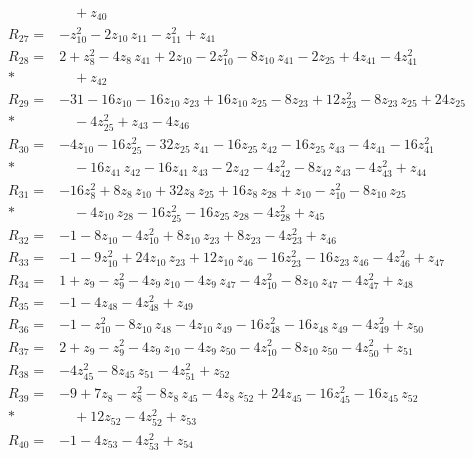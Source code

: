 \documentclass[11pt]{article}
\theoremstyle{remark}\newtheorem{remark}[theorem]{Remark}
\begin{document}
\begin{align*}
&\quad  + z_{40} \\[2pt]
R_{27}={}& -z_{10}^{2} - 2z_{10}\,z_{11} - z_{11}^{2} + z_{41} \\[2pt]
R_{28}={}& 2 + z_{8}^{2} - 4z_{8}\,z_{41} + 2z_{10} - 2z_{10}^{2} - 8z_{10}\,z_{41} - 2z_{25} + 4z_{41} - 4z_{41}^{2} \\*
&\quad  + z_{42} \\[2pt]
R_{29}={}& -31 - 16z_{10} - 16z_{10}\,z_{23} + 16z_{10}\,z_{25} - 8z_{23} + 12z_{23}^{2} - 8z_{23}\,z_{25} + 24z_{25} \\*
&\quad  - 4z_{25}^{2} + z_{43} - 4z_{46} \\[2pt]
R_{30}={}& -4z_{10} - 16z_{25}^{2} - 32z_{25}\,z_{41} - 16z_{25}\,z_{42} - 16z_{25}\,z_{43} - 4z_{41} - 16z_{41}^{2} \\*
&\quad  - 16z_{41}\,z_{42} - 16z_{41}\,z_{43} - 2z_{42} - 4z_{42}^{2} - 8z_{42}\,z_{43} - 4z_{43}^{2} + z_{44} \\[2pt]
R_{31}={}& -16z_{8}^{2} + 8z_{8}\,z_{10} + 32z_{8}\,z_{25} + 16z_{8}\,z_{28} + z_{10} - z_{10}^{2} - 8z_{10}\,z_{25} \\*
&\quad  - 4z_{10}\,z_{28} - 16z_{25}^{2} - 16z_{25}\,z_{28} - 4z_{28}^{2} + z_{45} \\[2pt]
R_{32}={}& -1 - 8z_{10} - 4z_{10}^{2} + 8z_{10}\,z_{23} + 8z_{23} - 4z_{23}^{2} + z_{46} \\[2pt]
R_{33}={}& -1 - 9z_{10}^{2} + 24z_{10}\,z_{23} + 12z_{10}\,z_{46} - 16z_{23}^{2} - 16z_{23}\,z_{46} - 4z_{46}^{2} + z_{47} \\[2pt]
R_{34}={}& 1 + z_{9} - z_{9}^{2} - 4z_{9}\,z_{10} - 4z_{9}\,z_{47} - 4z_{10}^{2} - 8z_{10}\,z_{47} - 4z_{47}^{2} + z_{48} \\[2pt]
R_{35}={}& -1 - 4z_{48} - 4z_{48}^{2} + z_{49} \\[2pt]
R_{36}={}& -1 - z_{10}^{2} - 8z_{10}\,z_{48} - 4z_{10}\,z_{49} - 16z_{48}^{2} - 16z_{48}\,z_{49} - 4z_{49}^{2} + z_{50} \\[2pt]
R_{37}={}& 2 + z_{9} - z_{9}^{2} - 4z_{9}\,z_{10} - 4z_{9}\,z_{50} - 4z_{10}^{2} - 8z_{10}\,z_{50} - 4z_{50}^{2} + z_{51} \\[2pt]
R_{38}={}& -4z_{45}^{2} - 8z_{45}\,z_{51} - 4z_{51}^{2} + z_{52} \\[2pt]
R_{39}={}& -9 + 7z_{8} - z_{8}^{2} - 8z_{8}\,z_{45} - 4z_{8}\,z_{52} + 24z_{45} - 16z_{45}^{2} - 16z_{45}\,z_{52} \\*
&\quad  + 12z_{52} - 4z_{52}^{2} + z_{53} \\[2pt]
R_{40}={}& -1 - 4z_{53} - 4z_{53}^{2} + z_{54} \\[2pt]

\end{align*}
\end{document}
